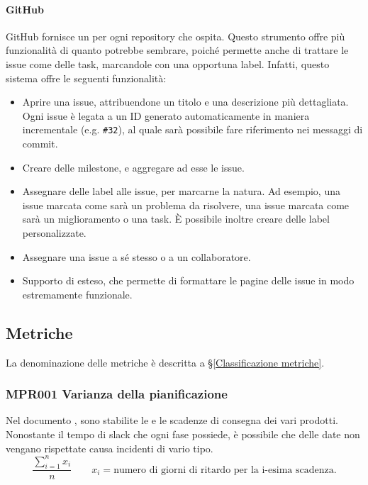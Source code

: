     		\paragraph{GitHub}\label{GitHub}
			GitHub fornisce un  per ogni repository che ospita. Questo strumento offre più funzionalità di quanto potrebbe sembrare,
			poich\'e permette anche di trattare le issue come delle task, marcandole con una opportuna label. Infatti, questo sistema offre le seguenti funzionalità:
			\begin{itemize}
				\item Aprire una issue, attribuendone un titolo e una descrizione più dettagliata. Ogni issue è legata a un ID generato automaticamente in maniera
					incrementale (e.g. \texttt{\#32}), al quale sarà possibile fare riferimento nei messaggi di commit.
				\item Creare delle milestone, e aggregare ad esse le issue.
				\item Assegnare delle label alle issue, per marcarne la natura. Ad esempio, una issue marcata come  sarà un problema da risolvere, una
					issue marcata come  sarà un miglioramento o una task. È possibile inoltre creare delle label personalizzate.
				\item Assegnare una issue a s\'e stesso o a un collaboratore.
				\item Supporto di  esteso, che permette di
				formattare le pagine delle issue in modo estremamente funzionale.
			\end{itemize}

			
			
	\subsection{Metriche}
	La denominazione delle metriche è descritta a \S\ref{Classificazione metriche}.
	
	\subsubsection{MPR001 Varianza della pianificazione}
	Nel documento \Doc{\PdPv}, sono stabilite le  e le scadenze di consegna dei vari prodotti.
	Nonostante il tempo di slack che ogni fase possiede, è possibile che delle date non vengano rispettate causa incidenti di vario tipo.
	\[\dfrac{\sum_{i=1}^{n} x_i}{n} \qquad x_i=\text{numero di giorni di ritardo per la i-esima scadenza.}\]
	
